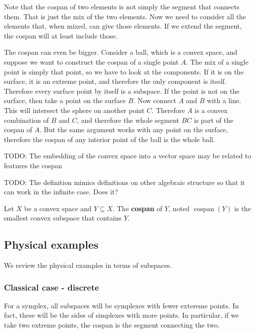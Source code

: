 \documentclass[11pt]{article}
\DeclareMathOperator{\cospan}{cospan}
\begin{document}
\begin{remark}
	Note that the cospan of two elements is not simply the segment that connects them. That is just the mix of the two elements. Now we need to consider all the elements that, when mixed, can give those elements. If we extend the segment, the cospan will at least include those.
	
	The cospan can even be bigger. Consider a ball, which is a convex space, and suppose we want to construct the cospan of a single point $A$. The mix of a single point is simply that point, so we have to look at the components. If it is on the surface, it is an extreme point, and therefore the only component is itself. Therefore every surface point by itself is a subspace. If the point is not on the surface, then take a point on the surface $B$. Now connect $A$ and $B$ with a line. This will intersect the sphere on another point $C$. Therefore $A$ is a convex combination of $B$ and $C$, and therefore the whole segment $BC$ is part of the cospan of $A$. But the same argument works with any point on the surface, therefore the cospan of any interior point of the ball is the whole ball. 
	
	TODO: The embedding of the convex space into a vector space may be related to features the cospan

	TODO: The definition mimics definitions on other algebraic structure so that it can work in the infinite case. Does it?
\end{remark}

\begin{defn}
	Let $X$ be a convex space and $Y \subseteq X$. The \textbf{cospan} of $Y$, noted $\cospan(Y)$ is the smallest convex subspace that contains $Y$.
\end{defn}


\subsection{Physical examples}

We review the physical examples in terms of subspaces.

\subsubsection{Classical case - discrete}

For a symplex, all subspaces will be symplexes with fewer extereme points. In fact, these will be the sides of simplexes with more points. In particular, if we take two extreme points, the cospan is the segment connecting the two.
\end{document}
